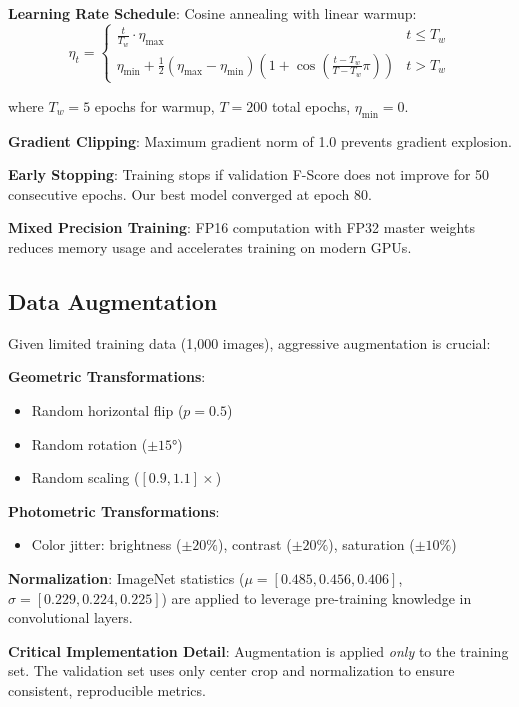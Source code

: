\textbf{Learning Rate Schedule}: Cosine annealing with linear warmup:
\begin{equation}
\eta_t = \begin{cases}
\frac{t}{T_w} \cdot \eta_{\max} & t \leq T_w \\
\eta_{\min} + \frac{1}{2}(\eta_{\max} - \eta_{\min})(1 + \cos(\frac{t-T_w}{T-T_w}\pi)) & t > T_w
\end{cases}
\end{equation}

where $T_w = 5$ epochs for warmup, $T = 200$ total epochs, $\eta_{\min} = 0$.

\textbf{Gradient Clipping}: Maximum gradient norm of 1.0 prevents gradient explosion.

\textbf{Early Stopping}: Training stops if validation F-Score does not improve for 50 consecutive epochs. Our best model converged at epoch 80.

\textbf{Mixed Precision Training}: FP16 computation with FP32 master weights reduces memory usage and accelerates training on modern GPUs.

\subsection{Data Augmentation}

Given limited training data (1,000 images), aggressive augmentation is crucial:

\textbf{Geometric Transformations}:
\begin{itemize}
    \item Random horizontal flip ($p = 0.5$)
    \item Random rotation ($\pm 15°$)
    \item Random scaling ($[0.9, 1.1]\times$)
\end{itemize}

\textbf{Photometric Transformations}:
\begin{itemize}
    \item Color jitter: brightness ($\pm 20\%$), contrast ($\pm 20\%$), saturation ($\pm 10\%$)
\end{itemize}

\textbf{Normalization}: ImageNet statistics ($\mu = [0.485, 0.456, 0.406]$, $\sigma = [0.229, 0.224, 0.225]$) are applied to leverage pre-training knowledge in convolutional layers.

\textbf{Critical Implementation Detail}: Augmentation is applied \textit{only} to the training set. The validation set uses only center crop and normalization to ensure consistent, reproducible metrics.
